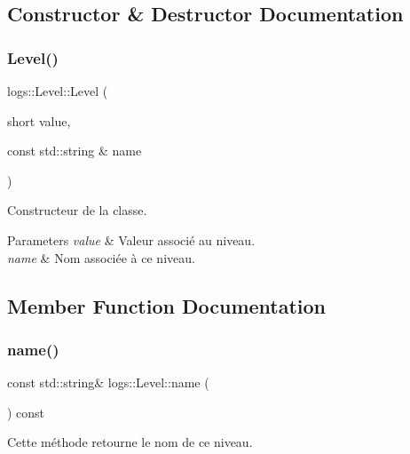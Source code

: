 \subsection{Constructor \& Destructor Documentation}
\mbox{\label{classlogs_1_1Level_af6c5f7e1d4de11ee1df98d5d45eb642f}} 
\subsubsection{\texorpdfstring{Level()}{Level()}}
{\footnotesize\ttfamily logs\+::\+Level\+::\+Level (\begin{DoxyParamCaption}\item[{short}]{value,  }\item[{const std\+::string \&}]{name }\end{DoxyParamCaption})\hspace{0.3cm}{\ttfamily [inline]}}



Constructeur de la classe. 


\begin{DoxyParams}{Parameters}
{\em value} & Valeur associé au niveau. \\
\hline
{\em name} & Nom associée à ce niveau. \\
\hline
\end{DoxyParams}


\subsection{Member Function Documentation}
\mbox{\label{classlogs_1_1Level_a068733ab7f581994ab9e2e9359a4434d}} 
\subsubsection{\texorpdfstring{name()}{name()}}
{\footnotesize\ttfamily const std\+::string\& logs\+::\+Level\+::name (\begin{DoxyParamCaption}{ }\end{DoxyParamCaption}) const\hspace{0.3cm}{\ttfamily [inline]}}



Cette méthode retourne le nom de ce niveau. 

